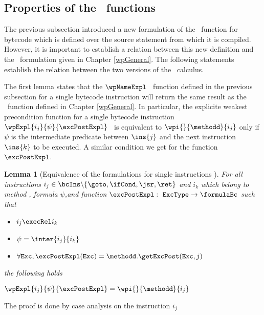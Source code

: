 \newtheorem{wpIns}{Lemma}[subsection]
\newtheorem{wpBlock}[wpIns]{Lemma}
\newtheorem{relWpExpr}[wpIns]{Lemma}
\newtheorem{relWpStmt}[wpIns]{Lemma}

\subsection{Properties of the \wpName \ functions}\label{pog:wpBcProp}
    The previous subsection introduced a new formulation of the 
    \wpName \ function for bytecode which is defined over
    the source statement from which it is compiled. 
    However, it is important to establish a relation between this new definition
    and  the \wpName \ formulation given in  Chapter \ref{wpGeneral}.
    The following statements establish the relation between 
    the two versions of the \wpName \  calculus.


The first lemma states that the $\wpNameExpl$ \ function defined in the previous subsection 
 for a single bytecode instruction
 will return the same result as the \fwpi \ function defined in Chapter \ref{wpGeneral}.  In particular, the explicite
 weakest precondition function for a single bytecode instruction 
  $\wpExpl{ i_j}{ \psi  }{ \excPostExpl} $ \ is equivalent to $\wpi{}{\methodd}{i_j}$ only if 
$\psi$  is the intermediate predicate between $\ins{j}$ and the next instruction $\ins{k}$ to be executed. A similar condition we get for the function
 $\excPostExpl$.

\begin{wpIns}[Equivalence of the formulations for single instructions ]\label{wpIns}
For all instructions  
 $i_j  \in \bcIns \backslash \{ \goto , \ifCond, \jsr, \ret \}$ and  $i_k$ which belong to method \methodd,  formula
 $\psi$,and  function $\excPostExpl : \mbox{ \rm \texttt{ExcType}}  \rightarrow \formulaBc $ such that
\begin{itemize}
   \item  $i_j \execRel i_k$
   \item  $\psi = \inter{i_j}{i_k}$  
   \item  $\forall \mbox{\rm\texttt{Exc}} ,  \excPostExpl( \mbox{\rm\texttt{Exc}} ) = \methodd.\getExcPost(\mbox{\rm\texttt{Exc}}, j ) $ 
\end{itemize}

the following holds 

   $\wpExpl{ i_j}{ \psi  }{ \excPostExpl} = \wpi{}{\methodd}{i_j} $
\end{wpIns}
The proof is done by case analysis on the instruction $i_j$\\

